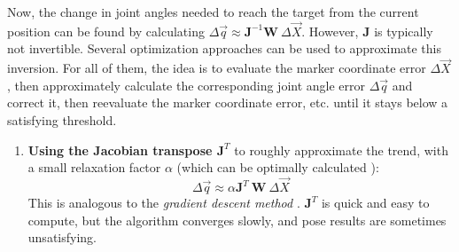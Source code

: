 \vspace*{0.5cm}
Now, the change in joint angles needed to reach the target from the current position can be found by calculating $\Delta \overrightarrow{q} \approx \textbf{J}^{-1} \textbf{W} \ \Delta\overrightarrow{X}$. However, \textbf{J} is typically not invertible. Several optimization approaches can be used to approximate this inversion. For all of them, the idea is to evaluate the marker coordinate error $\Delta\overrightarrow{X}$, then approximately calculate the corresponding joint angle error $\Delta \overrightarrow{q}$ and correct it, then reevaluate the marker coordinate error, etc. until it stays below a satisfying threshold.

\begin{enumerate}[itemsep=0em, topsep=0em, leftmargin=*]
    \item \textbf{Using the Jacobian transpose $\textbf{J}^T$} to roughly approximate the trend, with a small relaxation factor $\alpha$ (which can be optimally calculated \cite{Buss2009}):
    \begin{equation}
      \Delta \overrightarrow{q} \approx \alpha \textbf{J}^T \ \textbf{W} \ \Delta\overrightarrow{X}
    \end{equation} 
    This is analogous to the \emph{gradient descent method} \cite{Nocedal1999}. $\textbf{J}^T$ is quick and easy to compute, but the algorithm converges slowly, and pose results are sometimes unsatisfying.
    

\end{enumerate}
